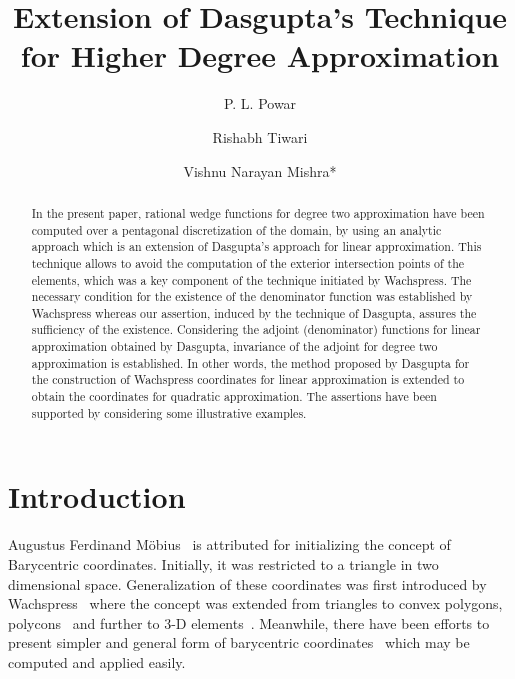 \documentclass[automatic-bibliography]{univsciauth}
\title{Extension of Dasgupta's Technique for Higher Degree Approximation}
\author[1]{P. L. Powar}
\author[1]{Rishabh Tiwari}
\author[2]{Vishnu Narayan Mishra*}
\begin{document}
\maketitle
\thispagestyle{firstpage}

\begin{abstract}
In the present paper, rational wedge functions for degree two approximation have
been computed over a pentagonal discretization of the domain, by using an
analytic approach which is an extension of Dasgupta\rq{}s approach for linear
approximation. This technique allows to avoid the computation of the exterior
intersection points of the elements, which was a key component of the technique
initiated by Wachspress. The necessary condition for the existence of the
denominator function was established by Wachspress whereas our assertion,
induced by the technique of Dasgupta, assures the sufficiency of the existence.
Considering the adjoint (denominator) functions for linear approximation
obtained by Dasgupta, invariance of the adjoint for degree two approximation is
established. In other words, the method proposed by Dasgupta for the
construction of Wachspress coordinates for linear approximation is extended to
obtain the coordinates for quadratic approximation. The assertions have been
supported by considering some illustrative examples.

\end{abstract}

\section{Introduction}
Augustus Ferdinand M\"obius~\cite{mo} is attributed for initializing the concept
of Barycentric coordinates. Initially, it was restricted to a triangle in two
dimensional space. Generalization of these coordinates was first introduced by
Wachspress~\cite{wach71} where the concept was extended from triangles to convex
polygons, polycons~\cite{wach73} and further to 3-D elements~\cite{warren, wach,
wachs}. Meanwhile, there have been efforts to present simpler and general form
of barycentric coordinates~\cite{1,2,3,4,5,6} which may be computed and applied
easily.
\end{document}

